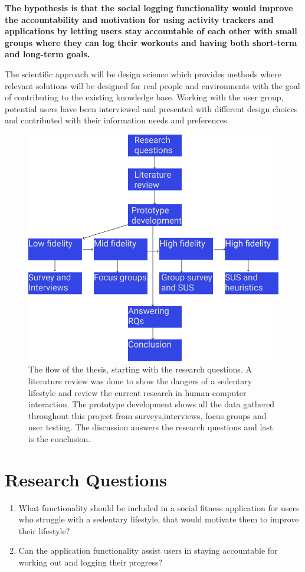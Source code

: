 \textbf{The hypothesis is that the social logging functionality would improve the accountability and motivation for using activity trackers and applications by letting users stay accountable of each other with small groups where they can log their workouts and having both short-term and long-term goals.}

The scientific approach will be design science which provides methods where relevant solutions will be designed for real people and environments with the goal of contributing to the existing knowledge base. Working with the user group, potential users have been interviewed and presented with different design choices and contributed with their information needs and preferences. 

\begin{figure}[H]
    \centering
    \includegraphics[scale=0.50]{figures/masterflowchart.png}
    \caption{The flow of the thesis, starting with the research questions. A literature review was done to show the dangers of a sedentary lifestyle and review the current research in human-computer interaction. The prototype development shows all the data gathered throughout this project from surveys,interviews, focus groups and user testing. The discussion answers the research questions and last is the conclusion.  }
\end{figure}

\section{Research Questions} \label{RQs}
\begin{enumerate}
    \item What functionality should be included in a social fitness application for users who struggle with a sedentary lifestyle, that would motivate them to improve their lifestyle? 

    \item Can the application functionality assist users in staying accountable for working out and logging their progress?
\end{enumerate}
\newpage
